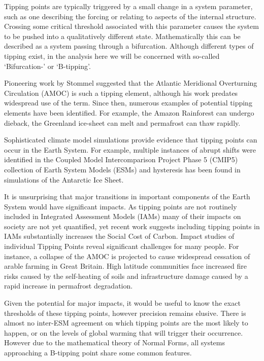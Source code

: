 Tipping points are typically triggered by a small change in a system parameter, such as one describing the forcing or
relating to aspects of the internal structure. Crossing some critical threshold associated with this parameter causes the system to be pushed into a qualitatively 
different state. Mathematically this can be described as a system passing through a bifurcation. 
Although different types of tipping exist\cite{Ashwin2012}, in the analysis here 
we will be concerned with so-called `Bifurcation-' or `B-tipping'.


Pioneering work by Stommel suggested that the Atlantic Meridional Overturning 
Circulation (AMOC)\cite{STOMMEL1961} is such a tipping element, although
his work predates widespread use of the term. Since then,
numerous examples of potential tipping elements have been identified.
For example, the Amazon Rainforest can undergo dieback\cite{Cox2000}, the 
Greenland ice-sheet can melt\cite{Feldmann2015} and
permafrost can thaw rapidly\cite{Steffen2018}.

Sophisticated climate model simulations\cite{Rahmstorf1995} provide evidence that tipping points can occur
in the Earth System. For example, multiple
instances of abrupt shifts were identified in the Coupled Model Intercomparison Project Phase 5 (CMIP5)\cite{Taylor2012}
collection of Earth System Models (ESMs)\cite{Drijfhout2015} and hysteresis has been found in 
simulations of the Antarctic Ice Sheet\cite{Garbe2020}. 

It is unsurprising that major transitions in important components
of the Earth System would have significant impacts. As tipping points
are not routinely included in Integrated Assessment Models (IAMs) many of 
their impacts on society are not yet quantified, yet recent 
work\cite{Dietz2021}
suggests including tipping points in IAMs
substantially increases the Social Cost 
of Carbon. Impact studies of individual 
Tipping Points reveal significant challenges for many people. For instance, a 
collapse of the AMOC is projected to cause
widespread cessation of arable farming in Great Britain\cite{Ritchie2020a}.
High latitude communities face increased fire risks caused 
by the self-heating of soils\cite{Clarke2021} and infrastructure damage 
caused by a rapid increase in permafrost degradation\cite{Teufel2019}. 


Given the potential for major impacts, it would be useful to know the exact thresholds of
these tipping points, however precision remains elusive\cite{Steffen2018}.
There is almost no inter-ESM
agreement on which tipping points are the most likely to happen, or on the
levels of global warming that will trigger their
occurrence\cite{Drijfhout2015}.
However due to the mathematical theory of Normal 
Forms\cite{Strogatz2015,guckenheimer2013}, all systems approaching a
B-tipping point share some common features.

